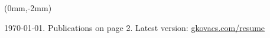 \documentclass[margin,line]{resume}
\begin{document}
\vspace{-20mm}

\begin{textblock*}{17cm}(0mm,-2mm) %
\begin{small}
\begin{center}
   \today. Publications on page 2. Latest version: \href{https://www.gkovacs.com/resume.pdf}{gkovacs.com/resume}
\end{center}
\end{small}

\end{textblock*}

\vspace{-5.0mm}

\end{document}

